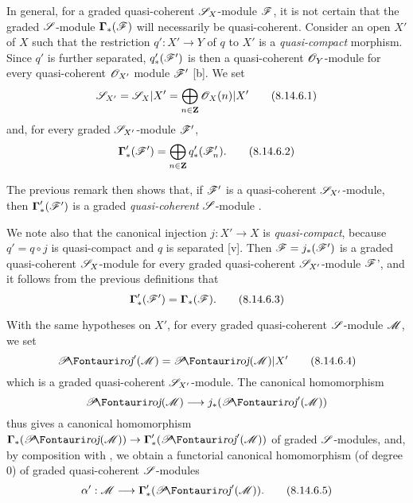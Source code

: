 \begin{env}[8.14.6]
\label{II.8.14.6}
In general, for a graded quasi-coherent $\mathscr{S}_X$-module $\mathscr{F}$, it is not certain that the graded $\mathscr{S}$-module $\boldsymbol{\Gamma}_*(\mathscr{F})$ will necessarily be quasi-coherent.
Consider an open $X'$ of $X$ such that the restriction $q':X'\to Y$ of $q$ to $X'$ is a \emph{quasi-compact} morphism.
Since $q'$ is further separated, $q'_*(\mathscr{F}')$ is then a quasi-coherent $\mathscr{O}_Y$-module for every quasi-coherent $\mathscr{O}_{X'}$ module $\mathscr{F}'$ [b].
We set
\[
\label{II.8.14.6.1}
    \mathscr{S}_{X'} = \mathscr{S}_X|X' = \bigoplus_{n\in\mathbf{Z}}\mathscr{O}_X(n)|X'
\tag{8.14.6.1}
\]
and, for every graded $\mathscr{S}_{X'}$-module $\mathscr{F}'$,
\[
\label{II.8.14.6.2}
    \boldsymbol{\Gamma}'_*(\mathscr{F}') = \bigoplus_{n\in\mathbf{Z}}q'_*(\mathscr{F}'_n).
\tag{8.14.6.2}
\]

The previous remark then shows that, if $\mathscr{F}'$ is a quasi-coherent $\mathscr{S}_{X'}$-module, then $\boldsymbol{\Gamma}'_*(\mathscr{F}')$ is a graded \emph{quasi-coherent} $\mathscr{S}$-module .

We note also that the canonical injection $j:X'\to X$ is \emph{quasi-compact}, because $q'=q\circ j$ is quasi-compact and $q$ is separated [v].
Then $\mathscr{F}=j_*(\mathscr{F}')$ is a graded quasi-coherent $\mathscr{S}_X$-module for every graded quasi-coherent $\mathscr{S}_{X'}$-module $\mathscr{F}$', and it follows from the previous definitions that
\[
\label{II.8.14.6.3}
    \boldsymbol{\Gamma}'_*(\mathscr{F}') = \boldsymbol{\Gamma}_*(\mathscr{F}).
\tag{8.14.6.3}
\]

With the same hypotheses on $X'$, for every graded quasi-coherent $\mathscr{S}$-module $\mathscr{M}$, we set
\[
\label{II.8.14.6.4}
    \shProj'(\sh{M}) = \shProj(\sh{M})|X'
\tag{8.14.6.4}
\]
which is a graded quasi-coherent $\mathscr{S}_{X'}$-module.
The canonical homomorphism
\[
    \shProj(\sh{M}) \to j_*(\shProj'(\sh{M}))
\]
 thus gives a canonical homomorphism $\boldsymbol{\Gamma}_*(\shProj(\sh{M}))\to\boldsymbol{\Gamma}'_*(\shProj'(\sh{M}))$ of graded $\mathscr{S}$-modules, and, by composition with , we obtain a functorial canonical homomorphism (of degree $0$) of graded quasi-coherent $\mathscr{S}$-modules
\[
\label{II.8.14.6.5}
    \alpha': \sh{M} \to \boldsymbol{\Gamma}'_*(\shProj'(\sh{M})).
\tag{8.14.6.5}
\]
\end{env}

